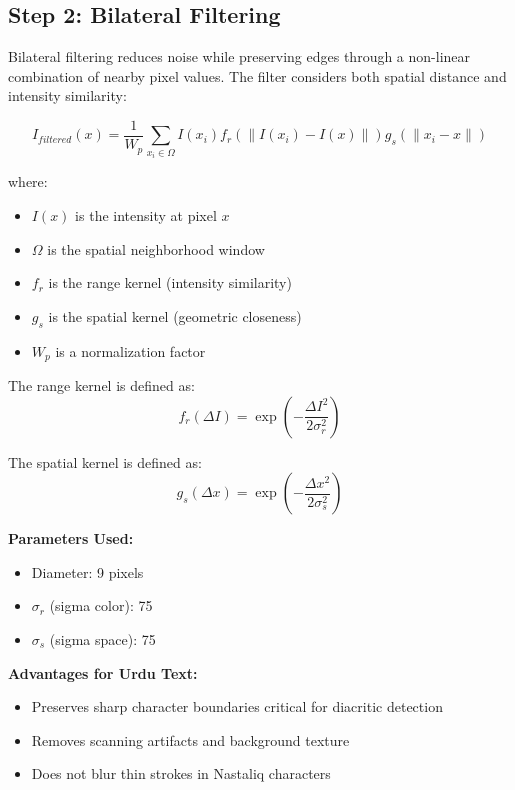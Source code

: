 \documentclass[12pt,a4paper,oneside]{report}
\begin{document}
\subsection{Step 2: Bilateral Filtering}

Bilateral filtering \cite{tomasi1998bilateral} reduces noise while preserving edges through a non-linear combination of nearby pixel values. The filter considers both spatial distance and intensity similarity:

\begin{equation}
    I_{filtered}(x) = \frac{1}{W_p} \sum_{x_i \in \Omega} I(x_i) f_r(\|I(x_i) - I(x)\|) g_s(\|x_i - x\|)
\end{equation}

where:
\begin{itemize}
    \item $I(x)$ is the intensity at pixel $x$
    \item $\Omega$ is the spatial neighborhood window
    \item $f_r$ is the range kernel (intensity similarity)
    \item $g_s$ is the spatial kernel (geometric closeness)
    \item $W_p$ is a normalization factor
\end{itemize}

The range kernel is defined as:
\begin{equation}
    f_r(\Delta I) = \exp\left(-\frac{\Delta I^2}{2\sigma_r^2}\right)
\end{equation}

The spatial kernel is defined as:
\begin{equation}
    g_s(\Delta x) = \exp\left(-\frac{\Delta x^2}{2\sigma_s^2}\right)
\end{equation}

\textbf{Parameters Used:}
\begin{itemize}
    \item Diameter: 9 pixels
    \item $\sigma_r$ (sigma color): 75
    \item $\sigma_s$ (sigma space): 75
\end{itemize}

\textbf{Advantages for Urdu Text:}
\begin{itemize}
    \item Preserves sharp character boundaries critical for diacritic detection
    \item Removes scanning artifacts and background texture
    \item Does not blur thin strokes in Nastaliq characters
\end{itemize}
\end{document}
